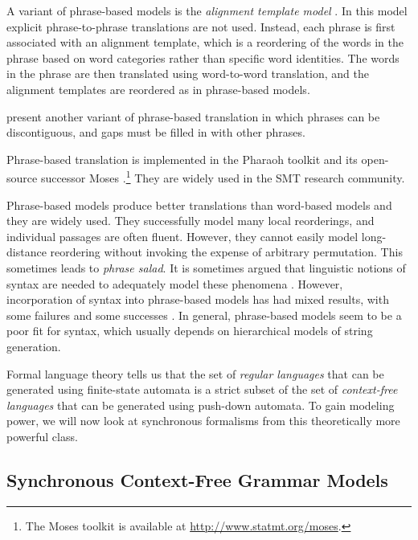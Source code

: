 A variant of phrase-based models is the {\em alignment template
model}  \citep{Och:1999:emnlp,Och:2004:cl}.  In this model explicit phrase-to-phrase translations are not used.
Instead, each phrase is first associated with an alignment template,
which is a reordering of the words in the phrase based on word categories rather than
specific word identities.  The words in the phrase are then translated
using word-to-word translation, and the alignment templates are reordered
as in phrase-based models.

\citet{Simard:2005:hlt-emnlp} present another
variant of phrase-based translation in which phrases can be 
discontiguous, and gaps must be filled in with other 
phrases. 

Phrase-based translation is implemented in the
Pharaoh toolkit \citep{Koehn:2004:amta} and its open-source
successor Moses \citep{Koehn:2007:acl-demo}.\footnote{The Moses toolkit
is available at \url{http://www.statmt.org/moses}.}  They are widely
used in the SMT research community.

Phrase-based models produce better translations 
than word-based models and they are widely used.  They
successfully model many local reorderings, and individual
passages are often fluent.  However, they cannot 
easily model long-distance reordering without invoking 
the expense of arbitrary permutation.  This sometimes leads
to {\em phrase salad}.  It is sometimes
argued that linguistic notions of syntax are needed to
adequately model these phenomena \citep{Burbank:2005:tr}.  
However, incorporation of syntax into
phrase-based models has had mixed results, with
some failures \citep{Koehn:2003:naacl,Och:2004:naacl}
and some successes \citep{Collins:2005:acl,Wang:2007:emnlp-conll}.
In general, phrase-based models seem to be a poor fit for
syntax, which usually depends on 
hierarchical models of string generation.

Formal language theory tells us that the set of 
{\em regular languages} that can be generated using finite-state
automata is a strict subset of the set of {\em context-free languages}
that can be generated using push-down automata.  To gain
modeling power, we will now look at synchronous formalisms from this
theoretically more powerful class.

\subsection{Synchronous Context-Free Grammar Models}\label{sec:hierarchical-models}

